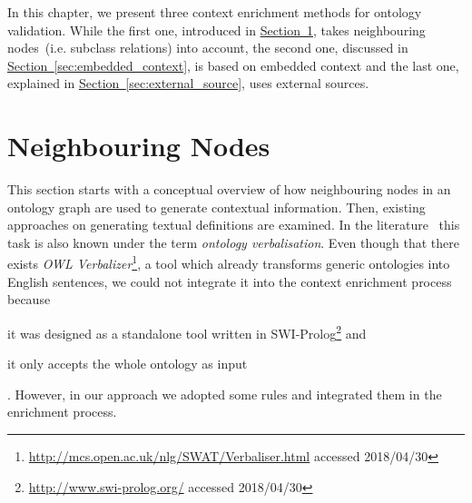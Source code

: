 \documentclass[draft,final]{vutinfth} %
\begin{document}
In this chapter, we present three context enrichment methods for ontology validation. While the first one, introduced in \hyperref[sec:neighboring_nodes]{Section~\ref*{sec:neighboring_nodes}}, takes neighbouring nodes~(i.e. subclass relations) into account, the second one, discussed in \hyperref[sec:embedded_context]{Section~\ref*{sec:embedded_context}}, is based on embedded context and the last one, explained in \hyperref[sec:external_source]{Section~\ref*{sec:external_source}}, uses external sources. 

\section{Neighbouring Nodes}\label{sec:neighboring_nodes}
This section starts with a conceptual overview of how neighbouring nodes in an ontology graph are used to generate contextual information. Then, existing approaches on generating textual definitions are examined. In the literature~\cite{soton265735} this task is also known under the term \textit{ontology verbalisation}. Even though that there exists \textit{OWL Verbalizer}\footnote{\url{http://mcs.open.ac.uk/nlg/SWAT/Verbaliser.html} accessed 2018/04/30}, a tool which already transforms generic ontologies into English sentences, we could not integrate it into the context enrichment process because 
\begin{inparaenum}[a)]
		\item it was designed as a standalone tool written in SWI-Prolog\footnote{\url{http://www.swi-prolog.org/} accessed 2018/04/30} and
		\item it only accepts the whole ontology as input
\end{inparaenum}.
However, in our approach we adopted some rules and integrated them in the enrichment process.
\end{document}
